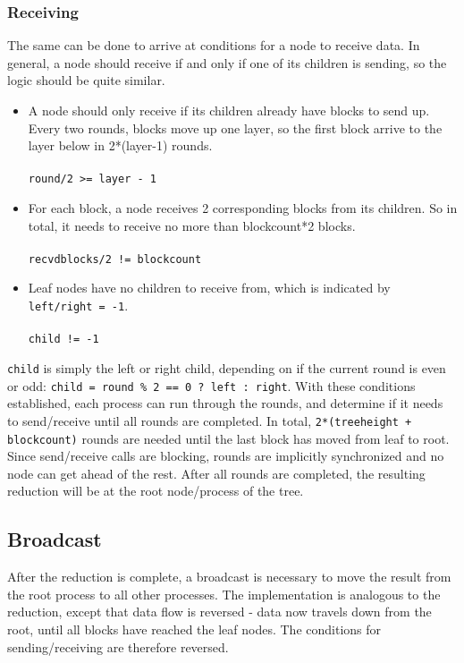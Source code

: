 \documentclass[twoside,twocolumn,hidelinks]{article}
\begin{document}
\subsubsection{Receiving}
The same can be done to arrive at conditions for a node to receive data. In general, a node should receive if and only if one of its children is sending, so the logic should be quite similar.

\begin{itemize}
      \item A node should only receive if its children already have blocks to send up. Every two rounds, blocks move up one layer, so the first block arrive to the layer below in 2*(layer-1) rounds. \\\\
      \texttt{round/2 >= layer - 1}\\
      \item For each block, a node receives 2 corresponding blocks from its children. So in total, it needs to receive no more than blockcount*2 blocks. \\\\
      \texttt{recvdblocks/2 != blockcount}\\
      \item Leaf nodes have no children to receive from, which is indicated by \texttt{left/right = -1}. \\\\
      \texttt{child != -1}
\end{itemize}

\texttt{child} is simply the left or right child, depending on if the current round is even or odd: \texttt{child = round \% 2 == 0 ? left : right}. With these conditions established, each process can run through the rounds, and determine if it needs to send/receive until all rounds are completed. In total, \texttt{2*(treeheight + blockcount)} rounds are needed until the last block has moved from leaf to root. Since send/receive calls are blocking, rounds are implicitly synchronized and no node can get ahead of the rest. After all rounds are completed, the resulting reduction will be at the root node/process of the tree.

\subsection{Broadcast}
After the reduction is complete, a broadcast is necessary to move the result from the root process to all other processes. The implementation is analogous to the reduction, except that data flow is reversed - data now travels down from the root, until all blocks have reached the leaf nodes. The conditions for sending/receiving are therefore reversed.
\end{document}
